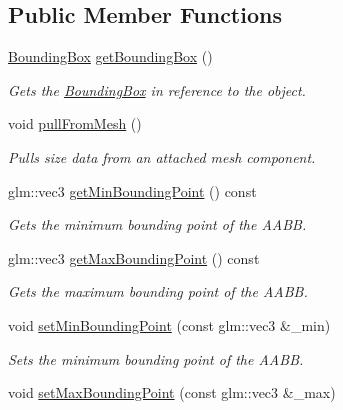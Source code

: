 \subsection*{Public Member Functions}
\begin{DoxyCompactItemize}
\item 
\hyperlink{class_cookie_eng_1_1_components_1_1_bounding_box}{Bounding\+Box} \hyperlink{class_cookie_eng_1_1_components_1_1_bounding_box_a7eae87eceb357b5b29081e854f0dd790}{get\+Bounding\+Box} ()
\begin{DoxyCompactList}\small\item\em Gets the \hyperlink{class_cookie_eng_1_1_components_1_1_bounding_box}{Bounding\+Box} in reference to the object. \end{DoxyCompactList}\item 
void \hyperlink{class_cookie_eng_1_1_components_1_1_bounding_box_acad51073f91813d60746832744fe23c3}{pull\+From\+Mesh} ()
\begin{DoxyCompactList}\small\item\em Pulls size data from an attached mesh component. \end{DoxyCompactList}\item 
glm\+::vec3 \hyperlink{class_cookie_eng_1_1_components_1_1_bounding_box_ab524d90c0bf3665bec9f2f2df3d41b89}{get\+Min\+Bounding\+Point} () const
\begin{DoxyCompactList}\small\item\em Gets the minimum bounding point of the A\+A\+BB. \end{DoxyCompactList}\item 
glm\+::vec3 \hyperlink{class_cookie_eng_1_1_components_1_1_bounding_box_a259683b1838bb58a3ca3704bdb4fb268}{get\+Max\+Bounding\+Point} () const
\begin{DoxyCompactList}\small\item\em Gets the maximum bounding point of the A\+A\+BB. \end{DoxyCompactList}\item 
void \hyperlink{class_cookie_eng_1_1_components_1_1_bounding_box_a268f31408a9f91765de7f9b052c97c85}{set\+Min\+Bounding\+Point} (const glm\+::vec3 \&\+\_\+min)
\begin{DoxyCompactList}\small\item\em Sets the minimum bounding point of the A\+A\+BB. \end{DoxyCompactList}\item 
void \hyperlink{class_cookie_eng_1_1_components_1_1_bounding_box_a5ad6bf701d391f3d5357a6e103e942e2}{set\+Max\+Bounding\+Point} (const glm\+::vec3 \&\+\_\+max)

\end{DoxyCompactItemize}
